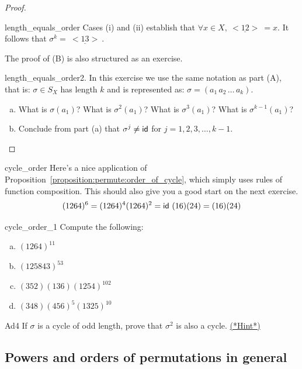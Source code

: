 \begin{proof}
\begin{exercise}{length_equals_order}
\noindent
Cases (i) and (ii) establish that  $\forall x \in X, \underline{~<12>~} = x$.  It follows that $\sigma^k = \underline{~<13>~}$.

\end{exercise}

\noindent
The proof of (B) is also structured as an exercise.

\begin{exercise}{length_equals_order2}. In this exercise we use the same notation as part (A), that is: $\sigma \in S_X$ has length $k$ and is represented as: $\sigma = (a_1 \, a_2 \, \ldots \, a_k)$. 
\begin{enumerate}[(a)]
\item
What is $\sigma(a_1)$? What is $\sigma^2(a_1)$? What is $\sigma^3(a_1)$? What is $\sigma^{k-1}(a_1)$?
\item
Conclude from part (a) that  $\sigma^j \neq {\sf{i}d} $ for $j = 1,2,3, \ldots, k-1.$
\end{enumerate}
\end{exercise}
\end{proof}

\begin{example}{cycle_order}
Here's a nice application of Proposition~\ref{proposition:permute:order_of_cycle}, which simply uses rules of function composition.  This should also give you a good start on the next exercise.
\[
(1 2 6 4)^6 = (1 2 6 4)^4 (1 2 6 4)^2 = {\sf{i}d} ~(1 6) (2 4) = (1 6)(2 4) \]
\end{example}

\begin{exercise}{cycle_order_1}
Compute the following:
\begin{multicols}{2}
\begin{enumerate}[(a)]
\item
$(1 2 6 4)^{11}$
\item
$(1 2 5 8 4 3)^{53}$
\item
$(3 5 2)(1 3 6)(1254)^{102}$
\item
$(3 4 8) (4 5 6)^5 (1 3 2 5)^{10}$
\end{enumerate}
\end{multicols}
\end{exercise}


\begin{exercise}{Ad4}
If $\sigma$ is a cycle of odd length, prove that $\sigma^2$ is also a
cycle.
\hyperref[sec:permute:hints]{(*Hint*)}  
\end{exercise}


\subsection{Powers and orders of permutations in general}

